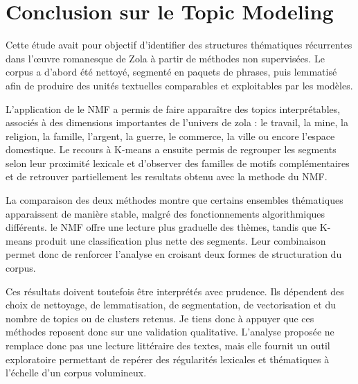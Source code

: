 \section{Conclusion sur le Topic Modeling}

Cette étude avait pour objectif d'identifier des structures thématiques récurrentes dans l'œuvre romanesque de Zola à partir de méthodes non supervisées. Le corpus a d'abord été nettoyé, segmenté en paquets de phrases, puis lemmatisé afin de produire des unités textuelles comparables et exploitables par les modèles.

L'application de le NMF a permis de faire apparaître des topics interprétables, associés à des dimensions importantes de l'univers de zola : le travail, la mine, la religion, la famille, l'argent, la guerre, le commerce, la ville ou encore l'espace domestique. Le recours à K-means a ensuite permis de regrouper les segments selon leur proximité lexicale et d'observer des familles de motifs complémentaires et de retrouver partiellement les resultats obtenu avec la methode du NMF.

La comparaison des deux méthodes montre que certains ensembles thématiques apparaissent de manière stable, malgré des fonctionnements algorithmiques différents. le NMF offre une lecture plus graduelle des thèmes, tandis que K-means produit une classification plus nette des segments. Leur combinaison permet donc de renforcer l'analyse en croisant deux formes de structuration du corpus.

Ces résultats doivent toutefois être interprétés avec prudence. Ils dépendent des choix de nettoyage, de lemmatisation, de segmentation, de vectorisation et du nombre de topics ou de clusters retenus. Je tiens donc à appuyer que ces méthodes reposent donc sur une validation qualitative. L'analyse proposée ne remplace donc pas une lecture littéraire des textes, mais elle fournit un outil exploratoire permettant de repérer des régularités lexicales et thématiques à l'échelle d'un corpus volumineux.
